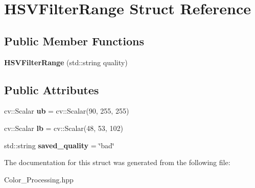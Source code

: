 \hypertarget{struct_h_s_v_filter_range}{}\section{H\+S\+V\+Filter\+Range Struct Reference}
\label{struct_h_s_v_filter_range}
\subsection*{Public Member Functions}
\begin{DoxyCompactItemize}
\item 
\mbox{\label{struct_h_s_v_filter_range_a4e37551e92211618e217752f0056847a}} 
{\bfseries H\+S\+V\+Filter\+Range} (std\+::string quality)
\end{DoxyCompactItemize}
\subsection*{Public Attributes}
\begin{DoxyCompactItemize}
\item 
\mbox{\label{struct_h_s_v_filter_range_a1c5b705f9992e014fd4dd7085e078c9d}} 
cv\+::\+Scalar {\bfseries ub} = cv\+::\+Scalar(90, 255, 255)
\item 
\mbox{\label{struct_h_s_v_filter_range_a0c5c2a10fb591c4dd1512ae81e1032a4}} 
cv\+::\+Scalar {\bfseries lb} = cv\+::\+Scalar(48, 53, 102)
\item 
\mbox{\label{struct_h_s_v_filter_range_a5ded3fde3f4b37d5e0de6f40fd508271}} 
std\+::string {\bfseries saved\+\_\+quality} = \char`\"{}bad\char`\"{}
\end{DoxyCompactItemize}


The documentation for this struct was generated from the following file\+:\begin{DoxyCompactItemize}
\item 
Color\+\_\+\+Processing.\+hpp\end{DoxyCompactItemize}
